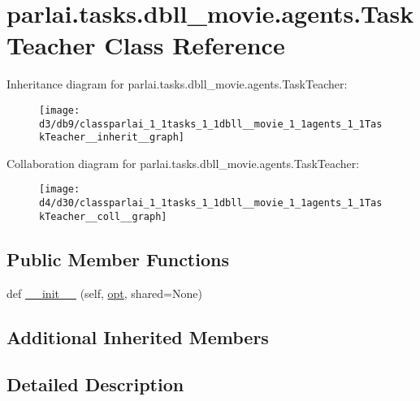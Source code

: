\hypertarget{classparlai_1_1tasks_1_1dbll__movie_1_1agents_1_1TaskTeacher}{}\section{parlai.\+tasks.\+dbll\+\_\+movie.\+agents.\+Task\+Teacher Class Reference}
\label{classparlai_1_1tasks_1_1dbll__movie_1_1agents_1_1TaskTeacher}


Inheritance diagram for parlai.\+tasks.\+dbll\+\_\+movie.\+agents.\+Task\+Teacher\+:\nopagebreak
\begin{figure}[H]
\begin{center}
\leavevmode
\texttt{[image: d3/db9/classparlai\_1\_1tasks\_1\_1dbll\_\_movie\_1\_1agents\_1\_1TaskTeacher\_\_inherit\_\_graph]}
\end{center}
\end{figure}


Collaboration diagram for parlai.\+tasks.\+dbll\+\_\+movie.\+agents.\+Task\+Teacher\+:\nopagebreak
\begin{figure}[H]
\begin{center}
\leavevmode
\texttt{[image: d4/d30/classparlai\_1\_1tasks\_1\_1dbll\_\_movie\_1\_1agents\_1\_1TaskTeacher\_\_coll\_\_graph]}
\end{center}
\end{figure}
\subsection*{Public Member Functions}
\begin{DoxyCompactItemize}
\item 
def \hyperlink{classparlai_1_1tasks_1_1dbll__movie_1_1agents_1_1TaskTeacher_a2eed62654cfdb4fc25372c15bbb810b3}{\+\_\+\+\_\+init\+\_\+\+\_\+} (self, \hyperlink{classparlai_1_1core_1_1teachers_1_1FbDialogTeacher_af7a9ec497b9cd0292d7b8fa220da7c28}{opt}, shared=None)
\end{DoxyCompactItemize}
\subsection*{Additional Inherited Members}


\subsection{Detailed Description}


